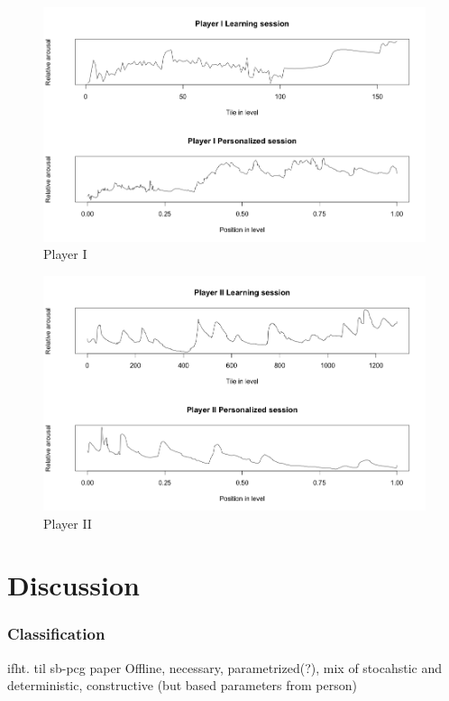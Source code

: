 \documentclass{llncs}
\begin{document}
\begin{figure}
\centering
\includegraphics[scale=0.4]{movieStar.png}
\caption{Player I}
\label{fig:playerFirst}
\end{figure}
\begin{figure}
\centering
\includegraphics[scale=0.4]{nicklas.png}
\caption{Player II}
\label{fig:playerLast}
\end{figure}

\section{Discussion}



\subsubsection{Classification}
ifht. til sb-pcg  paper
Offline, necessary, parametrized(?), mix of stocahstic and deterministic, constructive (but based parameters from person)
\end{document}
